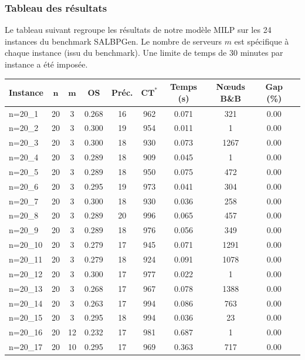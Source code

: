 \documentclass{article}
\begin{document}
\subsubsection{Tableau des résultats}

Le tableau suivant regroupe les résultats de notre modèle MILP sur les 24 instances du benchmark SALBPGen. Le nombre de serveurs $m$ est spécifique à chaque instance (issu du benchmark). Une limite de temps de 30 minutes par instance a été imposée.

\begin{table}[h!]
\centering
\small
\begin{tabular}{l c c c c c c c c c}
\toprule
\textbf{Instance} & $\boldsymbol{n}$ & $\boldsymbol{m}$ & \textbf{OS} & \textbf{Préc.} & $\boldsymbol{CT^*}$ & \textbf{Temps (s)} & \textbf{Nœuds B\&B} & \textbf{Gap (\%)} \\
\midrule
n=20\_1  & 20 & 3  & 0.268 & 16 & 962  & 0.071 & 321 & 0.00 \\
n=20\_2  & 20 & 3  & 0.300 & 19 & 954  & 0.011 & 1 & 0.00 \\
n=20\_3  & 20 & 3  & 0.300 & 18 & 930  & 0.073 & 1267 & 0.00 \\
n=20\_4  & 20 & 3  & 0.289 & 18 & 909  & 0.045 & 1 & 0.00 \\
n=20\_5  & 20 & 3  & 0.289 & 18 & 950  & 0.075 & 472 & 0.00 \\
n=20\_6  & 20 & 3  & 0.295 & 19 & 973  & 0.041 & 304 & 0.00 \\
n=20\_7  & 20 & 3  & 0.300 & 18 & 930  & 0.036 & 258 & 0.00 \\
n=20\_8  & 20 & 3  & 0.289 & 20 & 996  & 0.065 & 457 & 0.00 \\
n=20\_9  & 20 & 3  & 0.289 & 18 & 976  & 0.056 & 349 & 0.00 \\
n=20\_10 & 20 & 3  & 0.279 & 17 & 945  & 0.071 & 1291 & 0.00 \\
n=20\_11 & 20 & 3  & 0.279 & 18 & 924  & 0.091 & 1078 & 0.00 \\
n=20\_12 & 20 & 3  & 0.300 & 17 & 977  & 0.022 & 1 & 0.00 \\
n=20\_13 & 20 & 3  & 0.268 & 17 & 967  & 0.078 & 1388 & 0.00 \\
n=20\_14 & 20 & 3  & 0.263 & 17 & 994  & 0.086 & 763 & 0.00 \\
n=20\_15 & 20 & 3  & 0.295 & 18 & 994  & 0.036 & 23 & 0.00 \\
n=20\_16 & 20 & 12 & 0.232 & 17 & 981  & 0.687 & 1 & 0.00 \\
n=20\_17 & 20 & 10 & 0.295 & 17 & 969  & 0.363 & 717 & 0.00 \\

\end{tabular}
\end{table}
\end{document}
